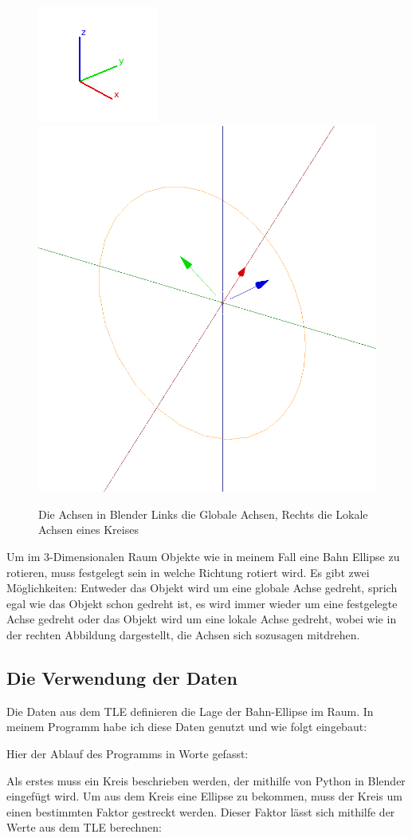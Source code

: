 \begin{figure}[h]
 \centerline{
 \includegraphics[height=0.5\textwidth]{figs/Achsen_w}
 \includegraphics[height=0.5\textwidth]{figs/LokaleAchsen_w}
 }
 \caption{Die Achsen in Blender \newline Links die Globale Achsen, Rechts die Lokale Achsen eines Kreises}
 \label{fig:Achsen}
\end{figure}

Um im 3-Dimensionalen Raum Objekte wie in meinem Fall eine Bahn Ellipse zu rotieren, muss
festgelegt sein in welche Richtung rotiert wird. Es gibt zwei Möglichkeiten: Entweder das Objekt wird um eine
globale Achse gedreht, sprich egal wie das Objekt schon gedreht ist, es wird immer wieder um eine
festgelegte Achse gedreht oder das Objekt wird um eine lokale Achse gedreht, wobei wie in der
rechten Abbildung dargestellt, die Achsen sich sozusagen mitdrehen.

\subsection{Die Verwendung der Daten}

Die Daten aus dem TLE definieren die Lage der Bahn-Ellipse im Raum.
In meinem Programm habe ich diese Daten genutzt und wie folgt eingebaut:
\par
Hier der Ablauf des Programms in Worte gefasst:
\par
Als erstes muss ein Kreis beschrieben werden, der mithilfe von Python in Blender eingefügt wird.
Um aus dem Kreis eine Ellipse zu bekommen, muss
der Kreis um einen bestimmten Faktor gestreckt werden. Dieser Faktor lässt sich mithilfe der
Werte aus dem TLE berechnen:
\par

